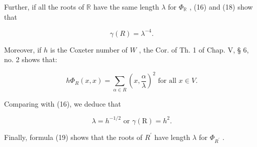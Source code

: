 Further, if all the roots of \(\mathbb{R}\) have the same length \(\lambda\) for \(\varPhi_{\mathbb{R}}\) , (16) and (18) show that

\[
\gamma (R) = \lambda^ {- 4}.\tag{20}
\]

Moreover, if \(h\) is the Coxeter number of \(W\) , the Cor. of Th. 1 of Chap. V, § 6, no. 2 shows that:

\[
h \Phi_ {R} (x, x) = \sum_ {\alpha \in R} \left(x, \frac {\alpha}{\lambda}\right) ^ {2} \text {   for   all   } x \in V.
\]

Comparing with (16), we deduce that

\[
\lambda = h ^ {- 1 / 2} \text { or } \gamma (\mathrm{R}) = h ^ {2}.\tag{21}
\]

Finally, formula (19) shows that the roots of \(R^{\prime}\) have length \(\lambda\) for \(\Phi_{R^{\prime}}\) .

